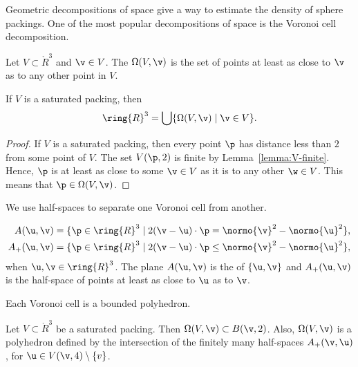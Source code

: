 Geometric decompositions of space give a way to estimate the density of sphere packings.
One of the most popular decompositions of space is the Voronoi cell decomposition.

\begin{definition}\label{def:voronoi} 
Let $V\subset\ring{R}^3$ and $\v\in V$.
The  
$\Omega(V,\v)$
is the set of points at least as close to $\v$ as to
any other point in $V$. 
\end{definition}

\begin{lemma}
If $V$ is a saturated packing, then 
\begin{equation}\label{eqn:vor-rn} 
\ring{R}^3 = \bigcup \{\Omega(V,\v)\mid \v \in V\}.
\end{equation}
\end{lemma}

\begin{proof}
  If $V$ is a saturated packing, then every point $\p$ has distance
  less than $2$ from some point of $V$.  The set $V(\p,2)$ is finite
  by Lemma~\ref{lemma:V-finite}.  Hence, $\p$ is at least as close to
  some $\v\in V$ as it is to any other $\w\in V$.  This means that
  $\p\in\Omega(V,\v)$.  
\end{proof}

We use half-spaces to separate one Voronoi cell from another.

\begin{definition}
\begin{eqnarray*} 
A(\u,\v) &= \{\p\in\ring{R}^3
\mid 2(\v-\u)\cdot \p = \normo{\v}^2 - \normo{\u}^2 \},\\
A_+(\u,\v) &= \{\p\in\ring{R}^3
\mid 2(\v-\u)\cdot \p \le \normo{\v}^2 - \normo{\u}^2 \},
\end{eqnarray*}
when $\u,\v\in\ring{R}^3$.  The plane $A(\u,\v)$ is the  of
$\{\u,\v\}$ and $A_+(\u,\v)$ is the half-space of points at least as
close to $\u$ as to $\v$.  
\end{definition}

Each Voronoi cell is a bounded polyhedron.

\begin{lemma}\label{lemma:V4} 
  Let $V\subset\ring{R}^3$ be a saturated packing.  Then
  $\Omega(V,\v)\subset B(\v,2)$.  Also, $\Omega(V,\v)$ is a polyhedron
  defined by the intersection of the finitely many half-spaces
  $A_+(\v,\u)$, for $\u\in V(\v,4)\setminus\{v\}$.
\end{lemma}

